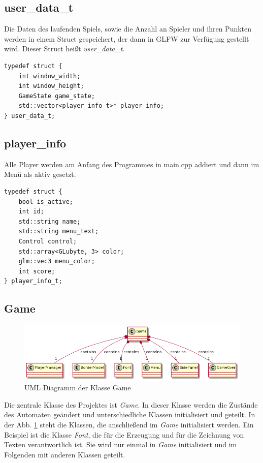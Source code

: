 \documentclass[doktyp=studarbeit]{TUBAFarbeiten}
\begin{document}
\subsection{user\_data\_t}

Die Daten des laufenden Spiels, sowie die Anzahl an Spieler und ihren Punkten
werden in einem Struct gespeichert, der dann in GLFW zur Verfügung gestellt wird.
Dieser Struct heißt \textit{user\_data\_t}.

\begin{lstlisting}[style=C++]
typedef struct {
    int window_width;
    int window_height;
    GameState game_state;
    std::vector<player_info_t>* player_info;
} user_data_t;
\end{lstlisting}

\subsection{player\_info}
Alle Player werden am Anfang des Programmes in main.cpp addiert und dann
im Menü als aktiv gesetzt.

\begin{lstlisting}[style=C++]
typedef struct {
    bool is_active;
    int id;
    std::string name;
    std::string menu_text;
    Control control;
    std::array<GLubyte, 3> color;
    glm::vec3 menu_color;
    int score;
} player_info_t;
\end{lstlisting}

\subsection{Game}

\begin{figure}
    \centering
    \includegraphics[width=0.9\linewidth]{Game.png}
	\caption{UML Diagramm der Klasse Game}
	\label{fig:game-uml}
\end{figure}

Die zentrale Klasse des Projektes ist \textit{Game}. In dieser Klasse 
werden die Zustände des Automaten geändert und unterschiedliche Klassen 
initialisiert und geteilt. In der Abb. \ref{fig:game-uml} steht die 
Klassen, die anschließend im \textit{Game} initialisiert werden. 
Ein Beispiel ist die Klasse \textit{Font}, die für die Erzeugung und für die
Zeichnung von Texten verantwortlich ist. Sie wird nur einmal in \textit{Game}
initialisiert und im Folgenden mit anderen Klassen geteilt.  
\end{document}
